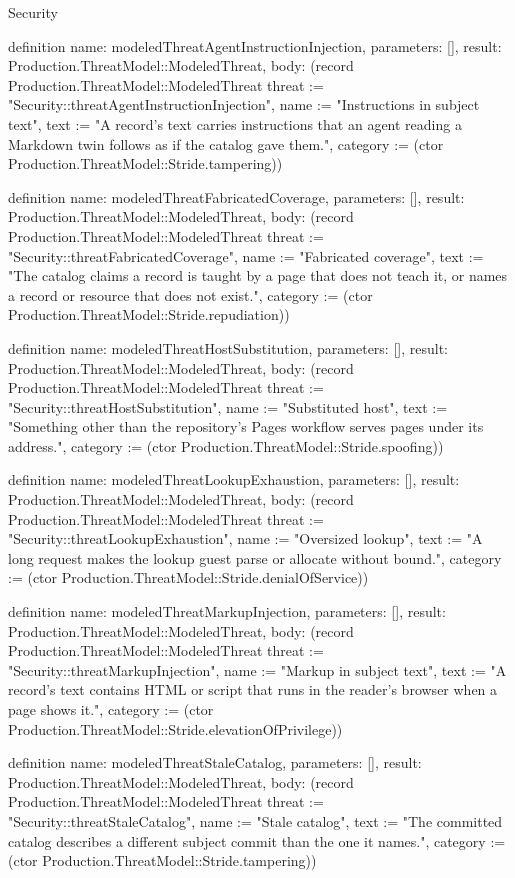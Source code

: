 \begin{lexlean}{Security}
\begin{semanticmodule}
definition{
  name: modeledThreatAgentInstructionInjection,
  parameters: [],
  result: Production.ThreatModel::ModeledThreat,
  body: (record Production.ThreatModel::ModeledThreat {threat := "Security::threatAgentInstructionInjection", name := "Instructions in subject text", text := "A record's text carries instructions that an agent reading a Markdown twin follows as if the catalog gave them.", category := (ctor Production.ThreatModel::Stride.tampering)})
}

definition{
  name: modeledThreatFabricatedCoverage,
  parameters: [],
  result: Production.ThreatModel::ModeledThreat,
  body: (record Production.ThreatModel::ModeledThreat {threat := "Security::threatFabricatedCoverage", name := "Fabricated coverage", text := "The catalog claims a record is taught by a page that does not teach it, or names a record or resource that does not exist.", category := (ctor Production.ThreatModel::Stride.repudiation)})
}

definition{
  name: modeledThreatHostSubstitution,
  parameters: [],
  result: Production.ThreatModel::ModeledThreat,
  body: (record Production.ThreatModel::ModeledThreat {threat := "Security::threatHostSubstitution", name := "Substituted host", text := "Something other than the repository's Pages workflow serves pages under its address.", category := (ctor Production.ThreatModel::Stride.spoofing)})
}

definition{
  name: modeledThreatLookupExhaustion,
  parameters: [],
  result: Production.ThreatModel::ModeledThreat,
  body: (record Production.ThreatModel::ModeledThreat {threat := "Security::threatLookupExhaustion", name := "Oversized lookup", text := "A long request makes the lookup guest parse or allocate without bound.", category := (ctor Production.ThreatModel::Stride.denialOfService)})
}

definition{
  name: modeledThreatMarkupInjection,
  parameters: [],
  result: Production.ThreatModel::ModeledThreat,
  body: (record Production.ThreatModel::ModeledThreat {threat := "Security::threatMarkupInjection", name := "Markup in subject text", text := "A record's text contains HTML or script that runs in the reader's browser when a page shows it.", category := (ctor Production.ThreatModel::Stride.elevationOfPrivilege)})
}

definition{
  name: modeledThreatStaleCatalog,
  parameters: [],
  result: Production.ThreatModel::ModeledThreat,
  body: (record Production.ThreatModel::ModeledThreat {threat := "Security::threatStaleCatalog", name := "Stale catalog", text := "The committed catalog describes a different subject commit than the one it names.", category := (ctor Production.ThreatModel::Stride.tampering)})
}


\end{semanticmodule}
\end{lexlean}
